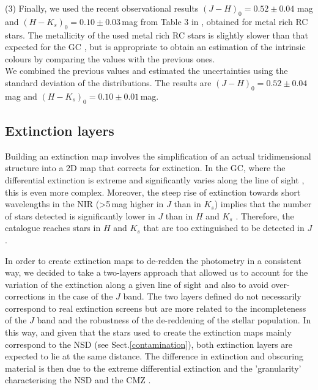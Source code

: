 \documentclass{aa}
\begin{document}
(3) Finally, we used the recent observational results $(J-H)_0=0.52\pm0.04$ mag and $(H-K_s)_0=0.10\pm0.03$\,mag from Table 3 in \citet{Plevne:2020aa}, obtained for metal rich RC stars. The metallicity of the used metal rich RC stars is slightly slower than that expected for the GC \citep[e.g.][]{Feldmeier-Krause:2017kq,Schultheis:2019aa,Nogueras-Lara:2019ad}, but is appropriate to obtain an estimation of the intrinsic colours by comparing the values with the previous ones.\\



We combined the previous values and estimated the uncertainties using the standard deviation of the distributions. The results are $(J-H)_0=0.52\pm0.04$\,mag and $(H-K_s)_0=0.10\pm0.01$\,mag.  





\subsection{Extinction layers}
\label{sel_criterion}

Building an extinction map involves the simplification of an actual tridimensional structure into a 2D map that corrects for extinction. In the GC, where the differential extinction is extreme and significantly varies along the line of sight \citep[e.g.][]{Nishiyama:2006tx,Nishiyama:2009oj,Nogueras-Lara:2018aa}, this is even more complex. Moreover, the steep rise of extinction towards short wavelengths in the NIR (>5\,mag higher in $J$ than in $K_s$) implies that the number of stars detected is significantly lower in $J$ than in $H$ and $K_s$ \citep[$\sim20\%$ of the stars were detected in $J$; $\sim65\%$, in $H$; and $\sim90\%$, in $K_s$, ][]{Nogueras-Lara:2019aa}. Therefore, the catalogue reaches stars in $H$ and $K_s$ that are too extinguished to be detected in $J$. 

In order to create extinction maps to de-redden the photometry in a consistent way, we decided to take a two-layers approach that allowed us to account for the variation of the extinction along a given line of sight and also to avoid over-corrections in the case of the $J$ band. The two layers defined do not necessarily correspond to real extinction screens but are more related to the incompleteness of the $J$ band and the robustness of the de-reddening of the stellar population. In this way, and given that the stars used to create the extinction maps mainly correspond to the NSD (see Sect.\ref{contamination}), both extinction layers are expected to lie at the same distance. The difference in extinction and obscuring material is then due to the extreme differential extinction and the 'granularity' characterising the NSD and the CMZ \citep[e.g.][]{Gosling:2006eq}.
\end{document}
